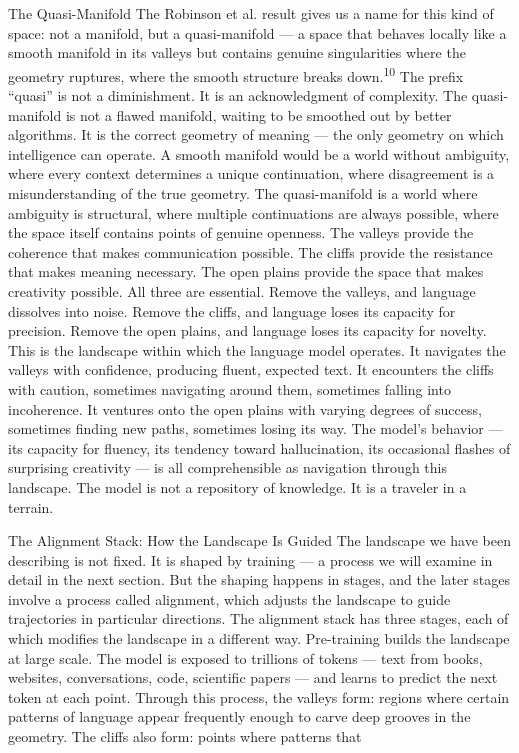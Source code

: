 The Quasi-Manifold The Robinson et al. result gives us a name for this kind of space: not a manifold, but a quasi-manifold — a space that behaves locally like a smooth manifold in its valleys but contains genuine singularities where the geometry ruptures, where the smooth structure breaks down.\textsuperscript{10} The prefix “quasi” is not a diminishment. It is an acknowledgment of complexity. The quasi-manifold is not a flawed manifold, waiting to be smoothed out by better algorithms. It is the correct geometry of meaning — the only geometry on which intelligence can operate. A smooth manifold would be a world without ambiguity, where every context determines a unique continuation, where disagreement is a misunderstanding of the true geometry. The quasi-manifold is a world where ambiguity is structural, where multiple continuations are always possible, where the space itself contains points of genuine openness. The valleys provide the coherence that makes communication possible. The cliffs provide the resistance that makes meaning necessary. The open plains provide the space that makes creativity possible. All three are essential. Remove the valleys, and language dissolves into noise. Remove the cliffs, and language loses its capacity for precision. Remove the open plains, and language loses its capacity for novelty. This is the landscape within which the language model operates. It navigates the valleys with confidence, producing fluent, expected text. It encounters the cliffs with caution, sometimes navigating around them, sometimes falling into incoherence. It ventures onto the open plains with varying degrees of success, sometimes finding new paths, sometimes losing its way. The model’s behavior — its capacity for fluency, its tendency toward hallucination, its occasional flashes of surprising creativity — is all comprehensible as navigation through this landscape. The model is not a repository of knowledge. It is a traveler in a terrain.

The Alignment Stack: How the Landscape Is Guided The landscape we have been describing is not fixed. It is shaped by training — a process we will examine in detail in the next section. But the shaping happens in stages, and the later stages involve a process called alignment, which adjusts the landscape to guide trajectories in particular directions. The alignment stack has three stages, each of which modifies the landscape in a different way. Pre-training builds the landscape at large scale. The model is exposed to trillions of tokens — text from books, websites, conversations, code, scientific papers — and learns to predict the next token at each point. Through this process, the valleys form: regions where certain patterns of language appear frequently enough to carve deep grooves in the geometry. The cliffs also form: points where patterns that

